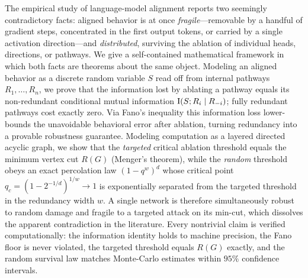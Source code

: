 The empirical study of language-model alignment reports two seemingly
contradictory facts: aligned behavior is at once \emph{fragile}---removable by a
handful of gradient steps, concentrated in the first output tokens, or carried by
a single activation direction---and \emph{distributed}, surviving the ablation of
individual heads, directions, or pathways. We give a self-contained mathematical
framework in which both facts are theorems about the same object. Modeling an
aligned behavior as a discrete random variable $S$ read off from internal pathways
$R_1,\dots,R_n$, we prove that the information lost by ablating a pathway equals its
non-redundant conditional mutual information $\operatorname{I}(S;R_i\mid R_{-i})$; fully redundant
pathways cost exactly zero. Via Fano's inequality this information loss lower-bounds
the unavoidable behavioral error after ablation, turning redundancy into a provable
robustness guarantee. Modeling computation as a layered directed acyclic graph, we
show that the \emph{targeted} critical ablation threshold equals the minimum vertex
cut $R(G)$ (Menger's theorem), while the \emph{random} threshold obeys an exact
percolation law $(1-q^w)^d$ whose critical point $q_c=(1-2^{-1/d})^{1/w}\to 1$ is
exponentially separated from the targeted threshold in the redundancy width $w$.
A single network is therefore simultaneously robust to random damage and fragile to
a targeted attack on its min-cut, which dissolves the apparent contradiction in the
literature. Every nontrivial claim is verified computationally: the information
identity holds to machine precision, the Fano floor is never violated, the targeted
threshold equals $R(G)$ exactly, and the random survival law matches Monte-Carlo
estimates within $95\%$ confidence intervals.
